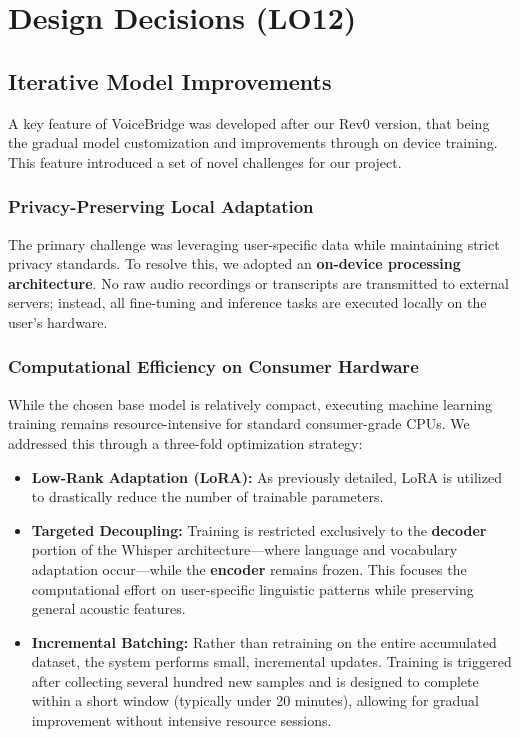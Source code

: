 \documentclass{article}
\begin{document}
\section{Design Decisions (LO12)}


\subsection{Iterative Model Improvements}
A key feature of VoiceBridge was developed after our Rev0 version, that being the gradual model customization and improvements through on device training. This feature introduced a set of novel challenges for our project.
\subsubsection{Privacy-Preserving Local Adaptation}
The primary challenge was leveraging user-specific data while maintaining strict privacy standards. To resolve this, we adopted an \textbf{on-device processing architecture}. No raw audio recordings or transcripts are transmitted to external servers; instead, all fine-tuning and inference tasks are executed locally on the user's hardware.

\subsubsection{Computational Efficiency on Consumer Hardware}
While the chosen base model is relatively compact, executing machine learning training remains resource-intensive for standard consumer-grade CPUs. We addressed this through a three-fold optimization strategy:
\begin{itemize}
    \item \textbf{Low-Rank Adaptation (LoRA):} As previously detailed, LoRA is utilized to drastically reduce the number of trainable parameters.
    \item \textbf{Targeted Decoupling:} Training is restricted exclusively to the \textbf{decoder} portion of the Whisper architecture—where language and vocabulary adaptation occur—while the \textbf{encoder} remains frozen. This focuses the computational effort on user-specific linguistic patterns while preserving general acoustic features.
    \item \textbf{Incremental Batching:} Rather than retraining on the entire accumulated dataset, the system performs small, incremental updates. Training is triggered after collecting several hundred new samples and is designed to complete within a short window (typically under 20 minutes), allowing for gradual improvement without intensive resource sessions.
\end{itemize}
\end{document}
